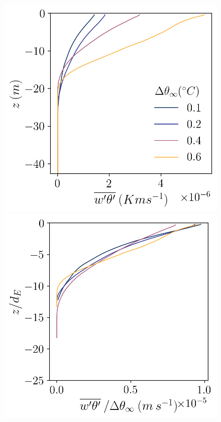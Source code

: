 \documentclass[draft]{styles/agujournal2019}
\begin{document}
\begin{figure}[h!]
\begin{minipage}{0.33\textwidth}
        \includegraphics[trim={0 0 0 0},clip,width=\textwidth]{Figures/heatflux_cmp_dT_43h_tav13h_z_profile.png}
    \end{minipage}%
    \begin{minipage}{0.33\textwidth}
        \includegraphics[trim={0 0 0 0},clip,width=\textwidth]{Figures/heatflux_cmp_dT_43h_tav13h_dTscale_z_profile.png}

\end{minipage}
\end{figure}
\end{document}
